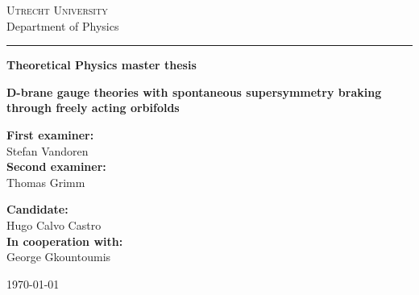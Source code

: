 
\begin{titlepage}

\begin{center}
{\scshape \Large
Utrecht University\\
}
\vspace{4mm}
{\Large
Department of Physics
}
\vspace{8mm}
\hrule
\vspace{4mm}
\begin{spacing}{1.8}
{\large\textbf{
Theoretical Physics master thesis
}}
\end{spacing}
\vspace{42mm}

\begin{spacing}{2.0}
{\Large \bf D-brane gauge theories with spontaneous supersymmetry braking through freely acting orbifolds}\\
\end{spacing}
\end{center}

\vfill
\noindent
\begin{minipage}[t]{0.5\textwidth}
\large
\textbf{First examiner:
}\\
Stefan Vandoren\\
 \vspace{5mm}
\textbf{Second examiner:}\\
Thomas Grimm\\
\end{minipage}
\hfill
\begin{minipage}[t]{0.5\textwidth}\raggedleft
\large
\textbf{Candidate:}\\
Hugo Calvo Castro\\
 \vspace{5mm}
\textbf{In cooperation with:}\\
George Gkountoumis\\
\end{minipage}

\vspace{24mm}

\begin{center}
\large \today
\end{center}

\end{titlepage}
\restoregeometry